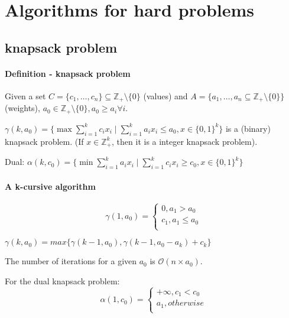 \documentclass[main]{subfiles}
\begin{document}

\section{Algorithms for hard problems}

\subsection{knapsack problem}
\paragraph{Definition - knapsack problem}

Given a set $C = \{ c_{1}, \dots, c_{n} \} \subseteq \mathbb{Z}_{+} \setminus
\{ 0\}$ (values) and $A = \{a_{1}, \dots, a_{n} \subseteq \mathbb{Z}_{+}
\setminus \{ 0\} \}$ (weights), $a_{0} \in \mathbb{Z}_{+} \setminus \{ 0\},
a_{0} \geq a_{i} \forall i$.

$\gamma(k, a_{0}) = \{ \max \sum_{i =1}^{k} c_{i} x_{i} \mid \sum_{i=1}^{k}
a_{i}x_{i} \leq a_{0}, x \in \{0,1\}^{k} \}$ is a (binary) knapsack problem.
(If $x \in \mathbb{Z}_{+}^{k}$, then it is a integer knapsack problem).

Dual:
$\alpha(k, c_{0}) = \{ \min \sum_{i =1}^{k} a_{i} x_{i} \mid \sum_{i=1}^{k}
c_{i}x_{i} \geq c_{0}, x \in \{0,1\}^{k} \}$

\paragraph{A k-cursive algorithm}
\[
  \gamma(1, a_{0})=\begin{cases}
               0, a_{1} > a_{0}\\
               c_{1}, a_{1} \leq a_{0}\\
            \end{cases}
\]

$\gamma(k, a_{0}) = max\{\gamma(k-1, a_{0}), \gamma(k-1, a_{0} - a_{k}) +
c_{k}\}$

The number of iterations for a given $a_{0}$ is $\mathcal{O}(n \times a_{0})$.

For the dual knapsack problem:
\[
  \alpha(1, c_{0})=\begin{cases}
               +\infty, c_{1} < c_{0}\\
               a_{1}, otherwise\\
            \end{cases}
\]
\end{document}
